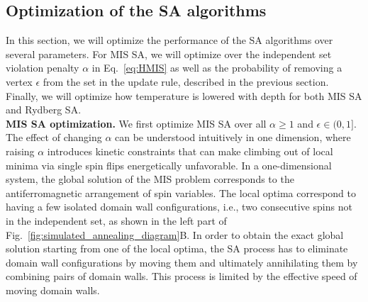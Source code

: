 \documentclass[twocolumn,amssymb,secnumarabic, prl, aps, nofootinbib]{revtex4-1}
\begin{document}
\subsection{Optimization of the SA algorithms \label{subsec:SA_optimization}}
In this section, we will optimize the performance of the SA algorithms over several parameters. For MIS SA, we will optimize over the independent set violation penalty $\alpha$ in Eq.~\eqref{eq:HMIS} as well as the probability of removing a vertex $\epsilon$ from the set in the update rule, described in the previous section. Finally, we will optimize how temperature is lowered with depth for both MIS SA and Rydberg SA.\\

\noindent \textbf{MIS SA optimization.}
We first optimize MIS SA over all $\alpha\geq 1$ and $\epsilon \in (0, 1].$ 
The effect of changing $\alpha$ can be understood intuitively in one dimension, where raising $\alpha$ introduces kinetic constraints that can make climbing out of local minima via single spin flips energetically unfavorable.
In a one-dimensional system, the global solution of the MIS problem corresponds to the antiferromagnetic arrangement of spin variables. The local optima correspond to having a few isolated domain wall configurations, i.e., two consecutive spins not in the independent set, as shown in the left part of Fig.~\ref{fig:simulated_annealing_diagram}B.
In order to obtain the exact global solution starting from one of the local optima, the SA process has to eliminate domain wall configurations by moving them and ultimately annihilating them by combining pairs of domain walls.
This process is limited by the effective speed of moving domain walls.
\end{document}
